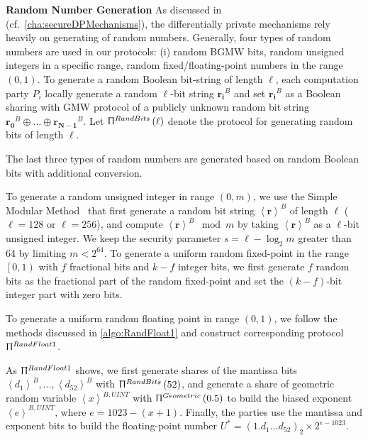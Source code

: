 \textbf{Random Number Generation}
As discussed in (cf.~\autoref{cha:secureDPMechanisms}), the differentially private mechanisms rely heavily on generating of random numbers.
Generally, four types of random numbers are used in our protocols: (i) random BGMW bits, random unsigned integers in a specific range, random fixed/floating-point numbers in the range $\left(0,1\right) $.
To generate a random Boolean bit-string of length $\ell$, each computation party $P_i$ locally generate a random $\ell$-bit string $\boldsymbol{r_i}^B$ and set $\boldsymbol{r_i}^B$ as a Boolean sharing with GMW protocol of a publicly unknown random bit string $\boldsymbol{r_0}^B \oplus \ldots \oplus \boldsymbol{r_{N-1}}^B $. Let $\Uppi^{RandBits}\left(\ell\right) $ denote the \smpc protocol for generating random bits of length $\ell$.

The last three types of random numbers are generated based on random Boolean bits with additional conversion.

To generate a random unsigned integer in range $\left(0,m\right) $, we use the Simple Modular Method~\cite{NISTRandomNumber2015} that first generate a random bit string $\left\langle \boldsymbol{r}\right\rangle^B $ of length $\ell$ ($\ell=128$ or $\ell=256$), and compute $ \left\langle \boldsymbol{r}\right\rangle^B \mod m$ by taking $\left\langle \boldsymbol{r}\right\rangle^B $ as a $\ell$-bit unsigned integer. We keep the security parameter $s=\ell-\log_2 m$ greater than 64 by limiting $m<2^{64}$.
To generate a uniform random fixed-point in the range $\left[0,1\right)$ with $f$ fractional bits and $k-f$ integer bits, we first generate $f$ random bits as the fractional part of the random fixed-point and set the $\left(k-f\right) $-bit integer part with zero bits.

                  To generate a uniform random floating point in range $\left(0,1\right) $, we follow the methods discussed in \autoref{algo:RandFloat1} and construct corresponding \smpc protocol $\Uppi^{RandFloat1}$.

                  As $\Uppi^{RandFloat1}$ shows, we first generate shares of the mantissa bits $\left\langle d_{1}\right\rangle^{B}, \ldots ,\left\langle d_{52}\right\rangle ^{B} $ with $\Uppi^{RandBits}\left(52\right) $, and generate a share of geometric random variable $\left\langle {x}\right\rangle^{B,UINT} $ with $\Uppi^{Geometric}\left(0.5\right) $ to build the biased exponent $\left\langle {e}\right\rangle^{B,UINT}$, where $e=1023-\left(x+1\right) $. Finally, the parties use the mantissa and exponent bits to build the floating-point number $U^{*}=\left(1.d_{1} \ldots d_{52}\right)_{2} \times 2^{e -1023} $.

